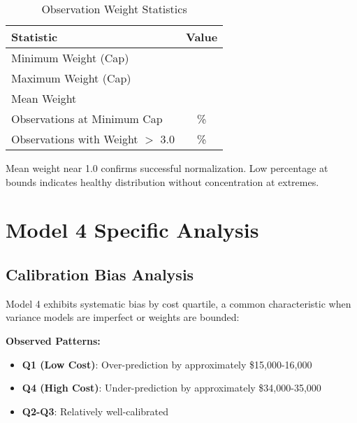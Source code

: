 \begin{table}[h]
\centering
\caption{Observation Weight Statistics}
\begin{tabular}{lc}
\toprule
\textbf{Statistic} & \textbf{Value} \\
\midrule
Minimum Weight (Cap) & \ModelFourWeightMin{} \\
Maximum Weight (Cap) & \ModelFourWeightMax{} \\
Mean Weight & \ModelFourWeightMean{} \\
Observations at Minimum Cap & \ModelFourWeightAtMinPct{}\% \\
Observations with Weight $>$ 3.0 & \ModelFourWeightAboveThreePct{}\% \\
\bottomrule
\end{tabular}
\end{table}

Mean weight near 1.0 confirms successful normalization. Low percentage at bounds indicates healthy distribution without concentration at extremes.

\newpage



\section{Model 4 Specific Analysis}

\subsection{Calibration Bias Analysis}


Model 4 exhibits systematic bias by cost quartile, a common characteristic when variance models are imperfect or weights are bounded:

\textbf{Observed Patterns:}
\begin{itemize}
    \item \textbf{Q1 (Low Cost)}: Over-prediction by approximately \$15,000-16,000
    \item \textbf{Q4 (High Cost)}: Under-prediction by approximately \$34,000-35,000
    \item \textbf{Q2-Q3}: Relatively well-calibrated
\end{itemize}

